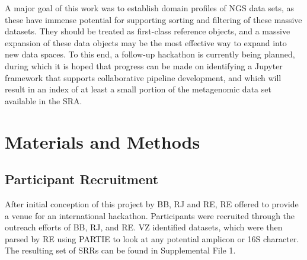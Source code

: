 \documentclass[genes, moreauthors]{Definitions/mdpi}
\begin{document}
A major goal of this work was to establish domain profiles of NGS data sets, as
these have immense potential for supporting sorting and filtering of these
massive datasets. They should be treated as first-class reference objects, and
a massive expansion of these data objects may be the most effective way to
expand into new data spaces. To this end, a follow-up hackathon is currently
being planned, during which it is hoped that progress can be made on
identifying a Jupyter framework that supports collaborative pipeline
development, and which will result in an index of at least a small portion of
the metagenomic data set available in the SRA.

\section{Materials and Methods}

  \subsection{Participant Recruitment}
  After initial conception of this project by BB, RJ and RE, RE offered to
  provide a venue for an international hackathon.  Participants were recruited
  through the outreach efforts of BB, RJ, and RE.  VZ identified datasets,
  which were then parsed by RE using PARTIE to look at any potential amplicon
  or 16S character. The resulting set of SRRs can be found in Supplemental
  File 1.
\end{document}
